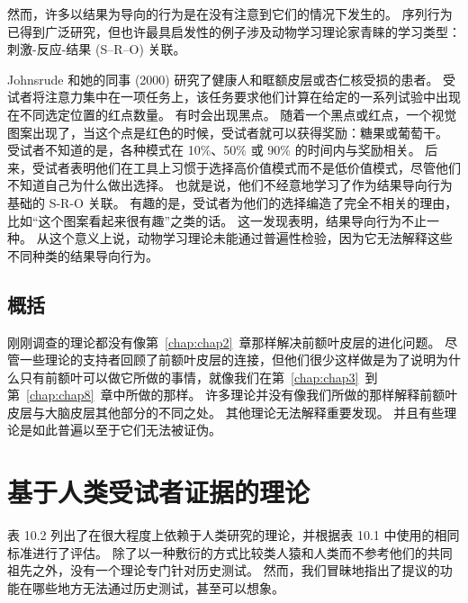 \par 
然而，许多以结果为导向的行为是在没有注意到它们的情况下发生的。 序列行为已得到广泛研究，但也许最具启发性的例子涉及动物学习理论家青睐的学习类型：刺激-反应-结果 (S–R–O) 关联。
\par 
Johnsrude 和她的同事 (2000) 研究了健康人和眶额皮层或杏仁核受损的患者。 受试者将注意力集中在一项任务上，该任务要求他们计算在给定的一系列试验中出现在不同选定位置的红点数量。 有时会出现黑点。 随着一个黑点或红点，一个视觉图案出现了，当这个点是红色的时候，受试者就可以获得奖励：糖果或葡萄干。 受试者不知道的是，各种模式在 10$\%$、50$\%$ 或 90$\%$ 的时间内与奖励相关。 后来，受试者表明他们在工具上习惯于选择高价值模式而不是低价值模式，尽管他们不知道自己为什么做出选择。 也就是说，他们不经意地学习了作为结果导向行为基础的 S-R-O 关联。 有趣的是，受试者为他们的选择编造了完全不相关的理由，比如“这个图案看起来很有趣”之类的话。 这一发现表明，结果导向行为不止一种。 从这个意义上说，动物学习理论未能通过普遍性检验，因为它无法解释这些不同种类的结果导向行为。
\subsection{概括}
刚刚调查的理论都没有像第~\ref{chap:chap2}~章那样解决前额叶皮层的进化问题。 尽管一些理论的支持者回顾了前额叶皮层的连接，但他们很少这样做是为了说明为什么只有前额叶可以做它所做的事情，就像我们在第~\ref{chap:chap3}~到第~\ref{chap:chap8}~章中所做的那样。 许多理论并没有像我们所做的那样解释前额叶皮层与大脑皮层其他部分的不同之处。 其他理论无法解释重要发现。 并且有些理论是如此普遍以至于它们无法被证伪。
\section{基于人类受试者证据的理论}
表 10.2 列出了在很大程度上依赖于人类研究的理论，并根据表 10.1 中使用的相同标准进行了评估。 除了以一种敷衍的方式比较类人猿和人类而不参考他们的共同祖先之外，没有一个理论专门针对历史测试。 然而，我们冒昧地指出了提议的功能在哪些地方无法通过历史测试，甚至可以想象。
